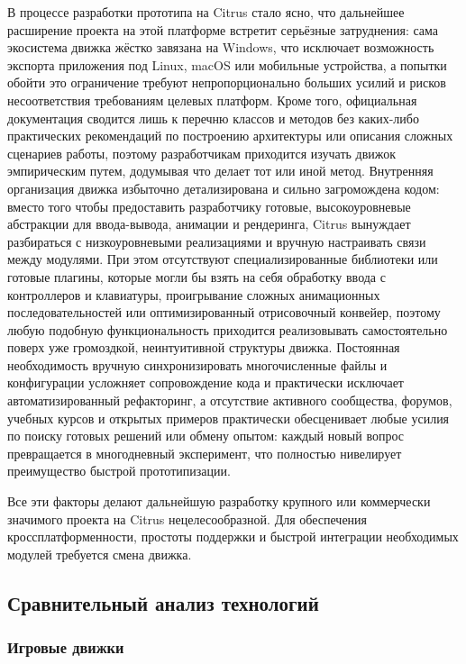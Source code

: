         В процессе разработки прототипа на Citrus стало ясно, что дальнейшее расширение проекта на этой платформе встретит серьёзные затруднения: сама экосистема 
        движка жёстко завязана на Windows, что исключает возможность экспорта приложения под Linux, macOS или мобильные устройства, а попытки 
        обойти это ограничение требуют непропорционально больших усилий и рисков несоответствия требованиям целевых платформ. Кроме того, официальная документация сводится 
        лишь к перечню классов и методов без каких-либо практических рекомендаций по построению архитектуры или описания сложных сценариев работы, поэтому разработчикам 
        приходится изучать движок эмпирическим путем, додумывая что делает тот или иной метод. Внутренняя организация движка избыточно детализирована и сильно загромождена кодом: 
        вместо того чтобы предоставить разработчику готовые, высокоуровневые абстракции для ввода-вывода, анимации и рендеринга, Citrus вынуждает 
        разбираться с низкоуровневыми реализациями и вручную настраивать связи между модулями. При этом отсутствуют 
        специализированные библиотеки или готовые плагины, которые могли бы взять на себя обработку ввода с контроллеров и клавиатуры, проигрывание сложных анимационных 
        последовательностей или оптимизированный отрисовочный конвейер, поэтому любую подобную функциональность приходится реализовывать самостоятельно поверх уже громоздкой, 
        неинтуитивной структуры движка. Постоянная необходимость вручную синхронизировать многочисленные файлы и конфигурации усложняет 
        сопровождение кода и практически исключает автоматизированный рефакторинг, а отсутствие активного сообщества, форумов, учебных курсов и открытых примеров практически 
        обесценивает любые усилия по поиску готовых решений или обмену опытом: каждый новый вопрос превращается в многодневный эксперимент, что полностью нивелирует преимущество 
        быстрой прототипизации.

        Все эти факторы делают дальнейшую разработку крупного или коммерчески значимого проекта на Citrus нецелесообразной. Для обеспечения кроссплатформенности, простоты поддержки 
        и быстрой интеграции необходимых модулей требуется смена движка.

    \subsection{Сравнительный анализ технологий}

        \subsubsection{Игровые движки}

